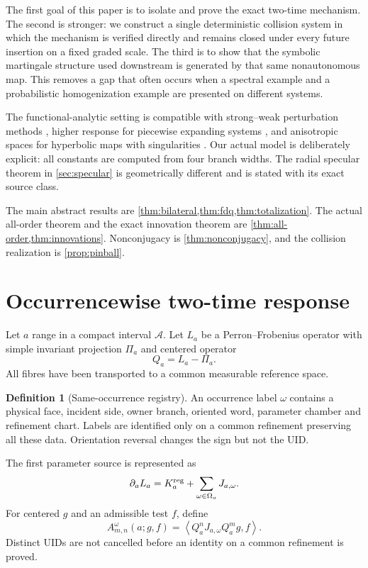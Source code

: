 \documentclass[11pt,reqno]{amsart}
\theoremstyle{definition}
\newtheorem{definition}[theorem]{Definition}
\theoremstyle{remark}
\newcommand{\A}{\mathcal A}
\newcommand{\pair}[2]{\left\langle #1,#2\right\rangle}
\begin{document}
The first goal of this paper is to isolate and prove the exact two-time
mechanism.  The second is stronger: we construct a single deterministic
collision system in which the mechanism is verified directly and remains
closed under every future insertion on a fixed graded scale.  The third is to
show that the symbolic martingale structure used downstream is generated by
that same nonautonomous map.  This removes a gap that often occurs when a
spectral example and a probabilistic homogenization example are presented on
different systems.

The functional-analytic setting is compatible with strong--weak perturbation
methods \cite{KellerLiverani1999}, higher response for piecewise expanding
systems \cite{BaladiSmania2008}, and anisotropic spaces for hyperbolic maps with
singularities \cite{DemersLiverani2008,BaladiDemersLiverani2018}.  Our actual
model is deliberately explicit: all constants are computed from four branch
widths.  The radial specular theorem in \cref{sec:specular} is geometrically
different and is stated with its exact source class.

The main abstract results are \cref{thm:bilateral,thm:fdq,thm:totalization}.
The actual all-order theorem and the exact innovation theorem are
\cref{thm:all-order,thm:innovations}.  Nonconjugacy is
\cref{thm:nonconjugacy}, and the collision realization is
\cref{prop:pinball}.

\section{Occurrencewise two-time response}\label{sec:abstract}

Let $a$ range in a compact interval $\A$.  Let $L_a$ be a Perron--Frobenius
operator with simple invariant projection $\Pi_a$ and centered operator
\[
 Q_a=L_a-\Pi_a.
\]
All fibres have been transported to a common measurable reference space.

\begin{definition}[Same-occurrence registry]\label{def:registry}
An occurrence label $\omega$ contains a physical face, incident side, owner
branch, oriented word, parameter chamber and refinement chart.  Labels are
identified only on a common refinement preserving all these data.  Orientation
reversal changes the sign but not the UID.
\end{definition}

The first parameter source is represented as
\begin{equation}\label{eq:source}
 \partial_aL_a=K_a^{\rm reg}+
 \sum_{\omega\in\Omega_a}J_{a,\omega}.
\end{equation}
For centered $g$ and an admissible test $f$, define
\begin{equation}\label{eq:atom}
 A_{m,n}^{\omega}(a;g,f)
 =\pair{Q_a^nJ_{a,\omega}Q_a^m g}{f}.
\end{equation}
Distinct UIDs are not cancelled before an identity on a common refinement is
proved.
\end{document}
